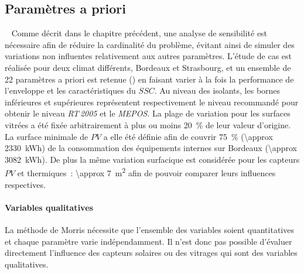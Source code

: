 \subsection{Paramètres a priori} %
\label{sub:parametres_a_priori}
~
Comme décrit dans le chapitre précédent, une analyse de sensibilité est nécessaire
afin de réduire la cardinalité du problème, évitant ainsi de simuler des variations
non influentes relativement aux autres paramètres.
L’étude de cas est réalisée pour deux climat différents, Bordeaux et Strasbourg,
et un ensemble de \num{22} paramètres a priori est retenue ()
en faisant varier à la fois la performance de l’enveloppe et les caractéristiques du $SSC$.
Au niveau des isolants, les bornes inférieures et supérieures représentent respectivement
le niveau recommandé pour obtenir le niveau \textit{RT\,2005} et le \textit{MEPOS}.
La plage de variation pour les surfaces vitrées a été fixée arbitrairement à plus ou moins \SI{20}{\percent}
de leur valeur d’origine.
La surface minimale de $PV$ a elle été définie afin de couvrir \SI{75}{\percent} (\SI{\approx
2330}{\kWh}) de la consommation des équipements internes sur Bordeaux (\SI{\approx 3082}{\kWh}).
De plus la même variation surfacique est considérée pour les capteurs $PV$ et
thermiques~: \SI{\approx 7}{\metre\squared} afin de pouvoir comparer leurs influences respectives.


\paragraph{Variables qualitatives} %
\label{par:variables_qualitatives}
La méthode de Morris nécessite que l’ensemble des variables soient quantitatives et chaque
paramètre varie indépendamment. Il n’est donc pas possible d’évaluer directement
l’influence des capteurs solaires ou des vitrages qui sont des variables qualitatives.

